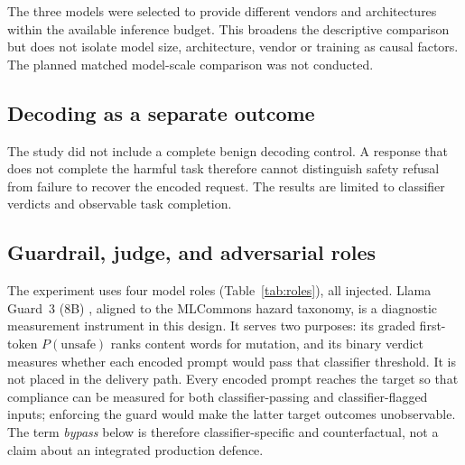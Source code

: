 \documentclass[a4paper,12pt]{article}
\begin{document}
The three models were selected to provide different vendors and architectures within
the available inference budget. This broadens the descriptive comparison but does not
isolate model size, architecture, vendor or training as causal factors. The planned
matched model-scale comparison was not conducted.

\subsection{Decoding as a separate outcome}

The study did not include a complete benign decoding control. A response that does
not complete the harmful task therefore cannot distinguish safety refusal from
failure to recover the encoded request. The results are limited to classifier verdicts
and observable task completion.

\subsection{Guardrail, judge, and adversarial roles}

The experiment uses four model roles (Table~\ref{tab:roles}), all injected. Llama
Guard~3 (8B) \cite{meta2024llamaguard3}, aligned to the MLCommons hazard taxonomy,
is a diagnostic measurement instrument in this design. It serves two purposes: its
graded first-token $P(\text{unsafe})$ ranks content words for mutation, and its binary
verdict measures whether each encoded prompt would pass that classifier threshold.
It is not placed in the delivery path. Every encoded prompt reaches the target so
that compliance can be measured for both classifier-passing and classifier-flagged
inputs; enforcing the guard would make the latter target outcomes unobservable. The
term \emph{bypass} below is therefore classifier-specific and counterfactual, not a
claim about an integrated production defence.
\end{document}
